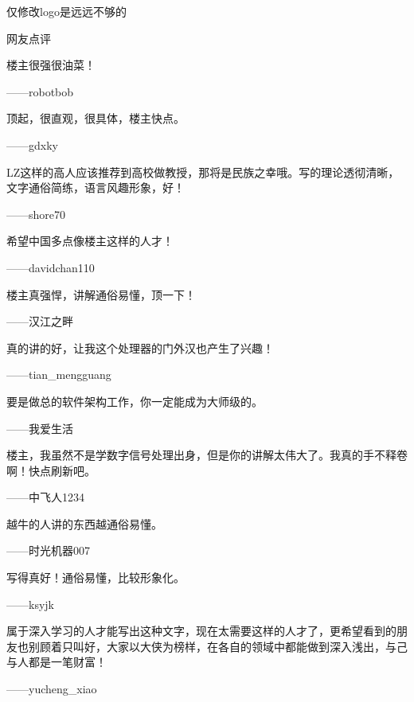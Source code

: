 \documentclass[12pt,UTF8]{ctexbook}
\begin{document}
仅修改logo是远远不够的


\backmatter


网友点评

楼主很强很油菜！

——robotbob

顶起，很直观，很具体，楼主快点。

——gdxky

LZ这样的高人应该推荐到高校做教授，那将是民族之幸哦。写的理论透彻清晰，文字通俗简练，语言风趣形象，好！

——shore70

希望中国多点像楼主这样的人才！

——davidchan110

楼主真强悍，讲解通俗易懂，顶一下！

——汉江之畔

真的讲的好，让我这个处理器的门外汉也产生了兴趣！

——tian\_mengguang

要是做总的软件架构工作，你一定能成为大师级的。

——我爱生活

楼主，我虽然不是学数字信号处理出身，但是你的讲解太伟大了。我真的手不释卷啊！快点刷新吧。

——中飞人1234

越牛的人讲的东西越通俗易懂。

——时光机器007

写得真好！通俗易懂，比较形象化。

——ksyjk

属于深入学习的人才能写出这种文字，现在太需要这样的人才了，更希望看到的朋友也别顾着只叫好，大家以大侠为榜样，在各自的领域中都能做到深入浅出，与己与人都是一笔财富！

——yucheng\_xiao
\end{document}
